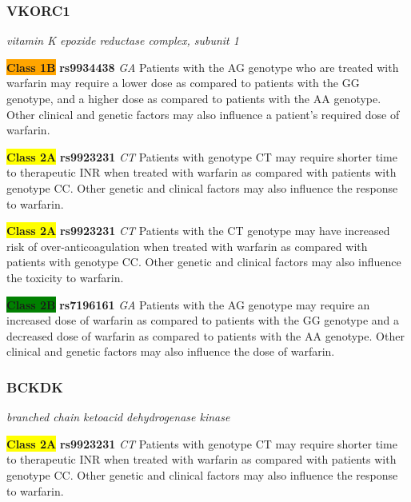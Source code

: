 \documentclass{report}
\begin{document}
\subsubsection{ VKORC1 }
\textit{ vitamin K epoxide reductase complex, subunit 1 } \newline



\textbf{\colorbox{orange} {Class 1B}} \textbf{ rs9934438 } \textit{ GA }
Patients with the AG genotype who are treated with warfarin may require a lower dose as compared to patients with the GG genotype, and a higher dose as compared to patients with the AA genotype. Other clinical and genetic factors may also influence a patient’s required dose of warfarin. \newline


\textbf{\colorbox{yellow} {Class 2A}} \textbf{ rs9923231 } \textit{ CT }
Patients with genotype CT may require shorter time to therapeutic INR when treated with warfarin as compared with patients with genotype CC. Other genetic and clinical factors may also influence the response to warfarin. \newline

\textbf{\colorbox{yellow} {Class 2A}} \textbf{ rs9923231 } \textit{ CT }
Patients with the CT genotype may have increased risk of over-anticoagulation when treated with warfarin as compared with patients with genotype CC. Other genetic and clinical factors may also influence the toxicity to warfarin.\newline


\textbf{\colorbox{green} {Class 2B}} \textbf{ rs7196161 } \textit{ GA }
Patients with the AG genotype may require an increased dose of warfarin as compared to patients with the GG genotype and a decreased dose of warfarin as compared to patients with the AA genotype. Other clinical and genetic factors may also influence the dose of warfarin. \newline\subsubsection{ BCKDK }
\textit{ branched chain ketoacid dehydrogenase kinase } \newline




\textbf{\colorbox{yellow} {Class 2A}} \textbf{ rs9923231 } \textit{ CT }
Patients with genotype CT may require shorter time to therapeutic INR when treated with warfarin as compared with patients with genotype CC. Other genetic and clinical factors may also influence the response to warfarin. \newline
\end{document}
